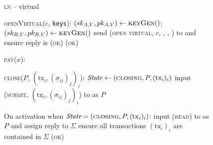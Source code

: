 \begin{figure}[H]
  \begin{processbox}{\textsc{ln} -- virtual}
    \begin{algorithmic}[1]
      \State \textsc{openVirtual}($c$, \texttt{keys}):
      \Indent
        \State $(sk_{A, V}, pk_{A, V}) \gets \textsc{keyGen}()$; $(sk_{B, V},
        pk_{B, V}) \gets \textsc{keyGen}()$
        \State {}
        \State send (\textsc{open virtual}, $c$, \bob, \charlie, \alice) to
        \adversary and ensure reply is \textsc{(ok)}
        \State \Return (\textsc{ok})
      \EndIndent
      \Statex

      \State \textsc{pay}($x$):
      \Indent
        \State \TODO{}
      \EndIndent
      \Statex

      \State \textsc{close}($P$, $(\mathrm{tx}_i, (\sigma_{ij})_j)_i$):
      \Indent
          \State $\mathit{State} \gets (\textsc{closing}, P, (\mathrm{tx}_i)_i)$
          \State input (\textsc{submit}, $(\mathrm{tx}_i, (\sigma_{ij})_j)_i$)
          to \ledger as $P$
      \EndIndent
      \Statex

      \State On activation when $\textit{State} = (\textsc{closing}, P,
      (\mathrm{tx}_i)_i)$:
      \Indent
        \State input (\textsc{read}) to \ledger as $P$ and assign reply to
        $\Sigma$
        \State ensure all transactions $(\mathrm{tx}_i)_i$ are contained in
        $\Sigma$
        \State \Return (\textsc{ok})
      \EndIndent
    \end{algorithmic}
  \end{processbox}
  \caption{}
  \label{code:ln:virtual}
\end{figure}
